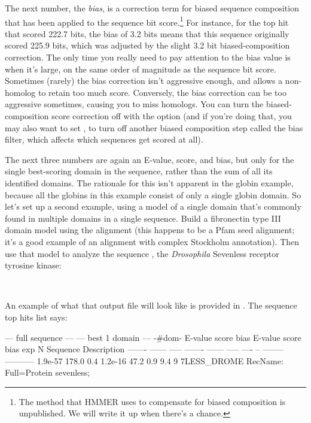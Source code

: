 The next number, the \emph{bias}, is a correction term for biased
sequence composition that has been applied to the sequence bit
score.\footnote{The method that HMMER uses to compensate for biased
  composition is unpublished. We will write
  it up when there's a chance.} For instance, for the top hit
 that scored 222.7 bits, the bias of 3.2 bits means
that this sequence originally scored 225.9 bits, which was adjusted by
the slight 3.2 bit biased-composition correction. The only time you
really need to pay attention to the bias value is when it's large, on
the same order of magnitude as the sequence bit score. Sometimes
(rarely) the bias correction isn't aggressive enough, and allows a
non-homolog to retain too much score. Conversely, the bias correction
can be too aggressive sometimes, causing you to miss homologs. You can
turn the biased-composition score correction off with the
 option (and if you're doing that, you may also want
to set , to turn off another biased composition step
called the bias filter, which affects which sequences get scored at
all).

The next three numbers are again an E-value, score, and bias, but only
for the single best-scoring domain in the sequence, rather than the
sum of all its identified domains. The rationale for this isn't
apparent in the globin example, because all the globins in this
example consist of only a single globin domain. So let's set up a
second example, using a model of a single domain that's commonly found
in multiple domains in a single sequence. Build a fibronectin type III
domain model using the  alignment (this happens
to be a Pfam seed alignment; it's a good example of an alignment with
complex Stockholm annotation). Then use that model to analyze the
sequence , the \emph{Drosophila} Sevenless
receptor tyrosine kinase:

 \\

An example of what that output file will look like is provided in
. The sequence top hits list says:

\begin{samepage}
\begin{sreoutput}
   --- full sequence ---   --- best 1 domain ---    -#dom-
    E-value  score  bias    E-value  score  bias    exp  N  Sequence    Description
    ------- ------ -----    ------- ------ -----   ---- --  --------    -----------
    1.9e-57  178.0   0.4    1.2e-16   47.2   0.9    9.4  9  7LESS_DROME  RecName: Full=Protein sevenless;
\end{sreoutput}
\end{samepage}

